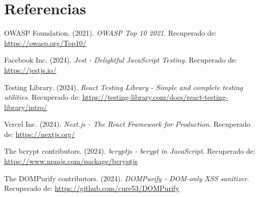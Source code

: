 \documentclass[12pt,a4paper]{article}
\begin{document}
\section{Referencias}

\begin{thebibliography}{99}

 OWASP Foundation. (2021). \textit{OWASP Top 10 2021}.
Recuperado de: \url{https://owasp.org/Top10/}

 Facebook Inc. (2024). \textit{Jest - Delightful JavaScript Testing}.
Recuperado de: \url{https://jestjs.io/}

 Testing Library. (2024). \textit{React Testing Library - Simple and complete testing utilities}.
Recuperado de: \url{https://testing-library.com/docs/react-testing-library/intro/}

 Vercel Inc. (2024). \textit{Next.js - The React Framework for Production}.
Recuperado de: \url{https://nextjs.org/}

 The bcrypt contributors. (2024). \textit{bcryptjs - bcrypt in JavaScript}.
Recuperado de: \url{https://www.npmjs.com/package/bcryptjs}

 The DOMPurify contributors. (2024). \textit{DOMPurify - DOM-only XSS sanitizer}.
Recuperado de: \url{https://github.com/cure53/DOMPurify}

\end{thebibliography}
\end{document}
